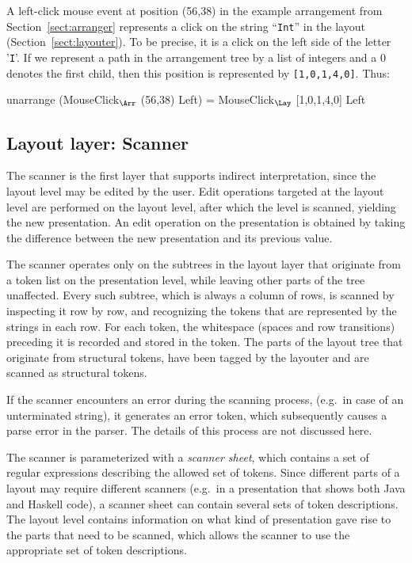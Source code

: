 A left-click mouse event at position (56,38) in the example arrangement from Section~\ref{sect:arranger} represents a click on the string ``\verb|Int|'' in the layout (Section~\ref{sect:layouter}). To be precise, it is a click on the left side of the letter '\verb|I|'. If we represent a path in the arrangement tree by a list of integers and a 0 denotes the first child, then this position is represented by \verb|[1,0,1,4,0]|. Thus:

\small \ttfamily
unarrange (MouseClick$_{\Arr}$ (56,38) Left) = MouseClick$_{\Lay}$ [1,0,1,4,0] Left
\rmfamily \normalsize


%																
\subsection{Layout layer: Scanner} \label{sect:scanner}

The scanner is the first layer that supports indirect interpretation, since the layout level may be edited by the user. Edit operations targeted at the layout level are performed on the layout level, after which the level is scanned, yielding the new presentation. An edit operation on the presentation is obtained by taking the difference between the new presentation and its previous value. 

The scanner operates only on the subtrees in the layout layer that originate from a token list on the presentation level, while leaving other parts of the tree unaffected. Every such subtree, which is always a column of rows, is scanned by inspecting it row by row, and recognizing the tokens that are represented by the strings in each row. For each token, the whitespace (spaces and row transitions) preceding it is recorded and stored in the token. The parts of the layout tree that originate from structural tokens, have been tagged by the layouter and are scanned as structural tokens.

If the scanner encounters an error during the scanning process, (e.g.\ in case of an unterminated string), it generates an error token, which subsequently causes a parse error in the parser. The details of this process are not discussed here. 

The scanner is parameterized with a {\em scanner sheet}, which contains a set of regular expressions describing the allowed set of tokens. Since different parts of a layout may require different scanners (e.g.\ in a presentation that shows both Java and Haskell code), a scanner sheet can contain several sets of token descriptions. The layout level contains information on what kind of presentation gave rise to the parts that need to be scanned, which allows the scanner to use the appropriate set of token descriptions.


